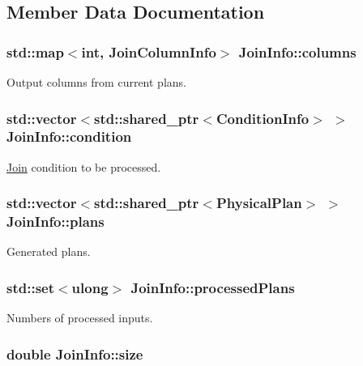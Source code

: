 \subsection{Member Data Documentation}
\hypertarget{class_join_info_a5acbaceb6d2731a73c9540581b4135ae}{
\subsubsection[{columns}]{\setlength{\rightskip}{0pt plus 5cm}std\+::map$<$int, {\bf Join\+Column\+Info}$>$ Join\+Info\+::columns}}\label{class_join_info_a5acbaceb6d2731a73c9540581b4135ae}
Output columns from current plans. \hypertarget{class_join_info_a0b9f3b02df4e768208f53c549e0b6e61}{
\subsubsection[{condition}]{\setlength{\rightskip}{0pt plus 5cm}std\+::vector$<$std\+::shared\+\_\+ptr$<${\bf Condition\+Info}$>$ $>$ Join\+Info\+::condition}}\label{class_join_info_a0b9f3b02df4e768208f53c549e0b6e61}
\hyperlink{class_join}{Join} condition to be processed. \hypertarget{class_join_info_acbddcf9cd01e91396492b94a627bdf69}{
\subsubsection[{plans}]{\setlength{\rightskip}{0pt plus 5cm}std\+::vector$<$std\+::shared\+\_\+ptr$<${\bf Physical\+Plan}$>$ $>$ Join\+Info\+::plans}}\label{class_join_info_acbddcf9cd01e91396492b94a627bdf69}
Generated plans. \hypertarget{class_join_info_a584f1ea54151c8e0c506911a6595c7cb}{
\subsubsection[{processed\+Plans}]{\setlength{\rightskip}{0pt plus 5cm}std\+::set$<$ulong$>$ Join\+Info\+::processed\+Plans}}\label{class_join_info_a584f1ea54151c8e0c506911a6595c7cb}
Numbers of processed inputs. \hypertarget{class_join_info_a526146b07ef6d1bba7475f7998bf0588}{
\subsubsection[{size}]{\setlength{\rightskip}{0pt plus 5cm}double Join\+Info\+::size}}\label{class_join_info_a526146b07ef6d1bba7475f7998bf0588}
